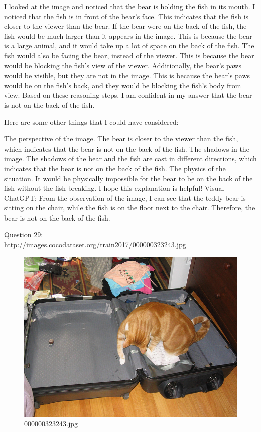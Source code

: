 \begin{enumerate}
        I looked at the image and noticed that the bear is holding the fish in its mouth.
        I noticed that the fish is in front of the bear's face. This indicates that the fish is closer to the viewer than the bear.
        If the bear were on the back of the fish, the fish would be much larger than it appears in the image. This is because the bear is a large animal, and it would take up a lot of space on the back of the fish.
        The fish would also be facing the bear, instead of the viewer. This is because the bear would be blocking the fish's view of the viewer.
        Additionally, the bear's paws would be visible, but they are not in the image. This is because the bear's paws would be on the fish's back, and they would be blocking the fish's body from view.
        Based on these reasoning steps, I am confident in my answer that the bear is not on the back of the fish.
        
        Here are some other things that I could have considered:
        
        The perspective of the image. The bear is closer to the viewer than the fish, which indicates that the bear is not on the back of the fish.
        The shadows in the image. The shadows of the bear and the fish are cast in different directions, which indicates that the bear is not on the back of the fish.
        The physics of the situation. It would be physically impossible for the bear to be on the back of the fish without the fish breaking.
        I hope this explanation is helpful!
        \subitem Visual ChatGPT: From the observation of the image, I can see that the teddy bear is sitting on the chair, while the fish is on the floor next to the chair. Therefore, the bear is not on the back of the fish.
    \end{enumerate}
    Question 29:\\http://images.cocodataset.org/train2017/000000323243.jpg
    \begin{figure}[h]
        \centering
        \includegraphics[width=0.8\linewidth]{../image set/easy/000000323243.jpg}
        \caption{000000323243.jpg}
    \end{figure}
